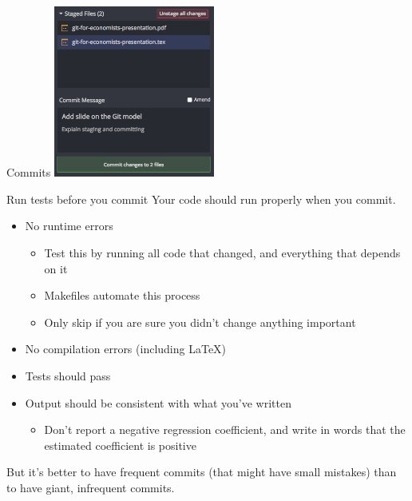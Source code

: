 \documentclass{beamer}
\begin{document}
\begin{frame}{Commits}
\includegraphics[width=200px]{screenshots/committing.png}
\end{frame}

\begin{frame}{Run tests before you commit}
Your code should run properly when you commit.
\begin{itemize}
\item No runtime errors
\begin{itemize}
\item Test this by running all code that changed, and everything that depends on it
\item Makefiles automate this process
\item Only skip if you are sure you didn't change anything important
\end{itemize}
\item No compilation errors (including \LaTeX)
\item Tests should pass
\item Output should be consistent with what you've written
\begin{itemize}
\item Don't report a negative regression coefficient, and write in words that the estimated coefficient is positive
\end{itemize}
\end{itemize}
But it's better to have frequent commits (that might have small mistakes) than to have giant, infrequent commits.
\end{frame}
\end{document}
